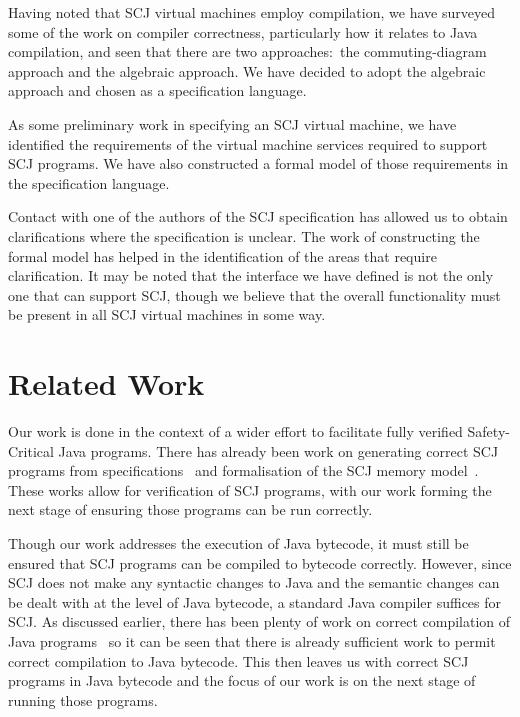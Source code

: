 \documentclass[a4paper,10pt]{report}
\begin{document}
Having noted that SCJ virtual machines employ compilation, we have
surveyed some of the work on compiler correctness, particularly how it
relates to Java compilation, and seen that there are two
approaches:~the commuting-diagram approach and the algebraic approach.
We have decided to adopt the algebraic approach and chosen \Circus{}
as a specification language.

As some preliminary work in specifying an SCJ virtual machine, we have
identified the requirements of the virtual machine services required
to support SCJ programs.
We have also constructed a formal model of those requirements in the
\Circus{} specification language.

Contact with one of the authors of the SCJ specification has allowed
us to obtain clarifications where the specification is unclear.
The work of constructing the formal model has helped in the
identification of the areas that require clarification.
It may be noted that the interface we have defined is not the only one
that can support SCJ, though we believe that the overall functionality
must be present in all SCJ virtual machines in some way.

\section{Related Work}
\label{related-work-section}

Our work is done in the context of a wider effort to facilitate fully
verified Safety-Critical Java programs.
There has already been work on generating correct SCJ programs from
\Circus{} specifications~\cite{cavalcanti2011, cavalcanti2013} and
formalisation of the SCJ memory model~\cite{cavalcanti2011a}.
These works allow for verification of SCJ programs, with our work
forming the next stage of ensuring those programs can be run
correctly.

Though our work addresses the execution of Java bytecode, it must
still be ensured that SCJ programs can be compiled to bytecode
correctly.
However, since SCJ does not make any syntactic changes to Java and the
semantic changes can be dealt with at the level of Java bytecode, a
standard Java compiler suffices for SCJ.
As discussed earlier, there has been plenty of work on correct
compilation of Java programs~\cite{klein2006, strecker2002,
  lochbihler2010, duran2005, stark2001} so it can be seen that there
is already sufficient work to permit correct compilation to Java
bytecode.
This then leaves us with correct SCJ programs in Java bytecode and the
focus of our work is on the next stage of running those programs.
\end{document}

